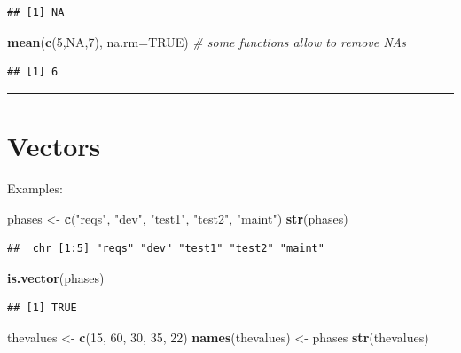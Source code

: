 \documentclass[]{book}
\newenvironment{Shaded}{\begin{snugshade}}{\end{snugshade}}
\newcommand{\KeywordTok}[1]{\textcolor[rgb]{0.13,0.29,0.53}{\textbf{{#1}}}}
\newcommand{\DataTypeTok}[1]{\textcolor[rgb]{0.13,0.29,0.53}{{#1}}}
\newcommand{\DecValTok}[1]{\textcolor[rgb]{0.00,0.00,0.81}{{#1}}}
\newcommand{\StringTok}[1]{\textcolor[rgb]{0.31,0.60,0.02}{{#1}}}
\newcommand{\CommentTok}[1]{\textcolor[rgb]{0.56,0.35,0.01}{\textit{{#1}}}}
\newcommand{\OtherTok}[1]{\textcolor[rgb]{0.56,0.35,0.01}{{#1}}}
\newcommand{\NormalTok}[1]{{#1}}
\begin{document}
\begin{verbatim}
## [1] NA
\end{verbatim}

\begin{Shaded}
\begin{Highlighting}[]
\KeywordTok{mean}\NormalTok{(}\KeywordTok{c}\NormalTok{(}\DecValTok{5}\NormalTok{,}\OtherTok{NA}\NormalTok{,}\DecValTok{7}\NormalTok{), }\DataTypeTok{na.rm=}\OtherTok{TRUE}\NormalTok{)  }\CommentTok{# some functions allow to remove NAs}
\end{Highlighting}
\end{Shaded}

\begin{verbatim}
## [1] 6
\end{verbatim}

\begin{center}\rule{0.5\linewidth}{\linethickness}\end{center}

\section{Vectors}\label{vectors}

Examples:

\begin{Shaded}
\begin{Highlighting}[]
\NormalTok{phases <-}\StringTok{ }\KeywordTok{c}\NormalTok{(}\StringTok{"reqs"}\NormalTok{, }\StringTok{"dev"}\NormalTok{, }\StringTok{"test1"}\NormalTok{, }\StringTok{"test2"}\NormalTok{, }\StringTok{"maint"}\NormalTok{)}
\KeywordTok{str}\NormalTok{(phases)}
\end{Highlighting}
\end{Shaded}

\begin{verbatim}
##  chr [1:5] "reqs" "dev" "test1" "test2" "maint"
\end{verbatim}

\begin{Shaded}
\begin{Highlighting}[]
\KeywordTok{is.vector}\NormalTok{(phases)}
\end{Highlighting}
\end{Shaded}

\begin{verbatim}
## [1] TRUE
\end{verbatim}

\begin{Shaded}
\begin{Highlighting}[]
\NormalTok{thevalues <-}\StringTok{ }\KeywordTok{c}\NormalTok{(}\DecValTok{15}\NormalTok{, }\DecValTok{60}\NormalTok{, }\DecValTok{30}\NormalTok{, }\DecValTok{35}\NormalTok{, }\DecValTok{22}\NormalTok{)}
\KeywordTok{names}\NormalTok{(thevalues) <-}\StringTok{ }\NormalTok{phases}
\KeywordTok{str}\NormalTok{(thevalues)}
\end{Highlighting}
\end{Shaded}
\end{document}
